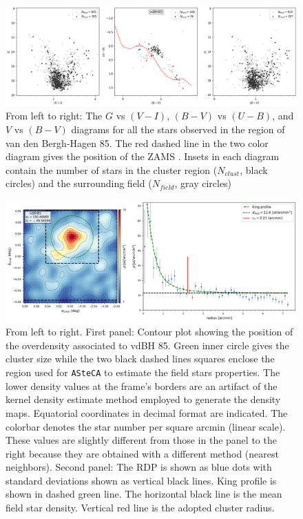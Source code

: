 \documentclass[draft]{aa}
\begin{document}
\begin{figure}[ht]
    \centering
    \includegraphics[width=\hsize]{../figs/obs_vdBH85.png}
\caption{From left to right: The $G$ vs $(V-I)$, $(B-V)$ vs $(U-B)$, and
$V$ vs $(B-V)$ diagrams for all the stars observed in the region of van
den Bergh-Hagen 85.
The red dashed line in the two color diagram gives the position of the ZAMS
\citep{Aller1982}. Insets in each diagram contain the number of stars 
in the cluster region ($N_{clust}$, black circles) and the surrounding
field ($N_{field}$, gray circles)
}
    \label{fig:photom_vdBH85} %
\end{figure}

\begin{figure}[ht]
    \centering
    \includegraphics[width=\hsize]{../figs/dmap_vdbh85.png}
\caption{From left to right. First panel:
Contour plot showing the position of the overdensity associated to vdBH 85.
Green inner circle gives the cluster size while the two black dashed lines
squares enclose the region used for \texttt{ASteCA} to estimate the field stars
properties. The lower density values at the frame's borders are an
artifact of the kernel density estimate method employed to generate the density
maps.
Equatorial coordinates in decimal format are indicated.
The colorbar denotes the star number per square arcmin (linear scale).
These values are slightly different from those in the panel to the right
because they are obtained with a different method (nearest neighbors).
%
Second panel: The RDP is shown as blue dots with standard deviations shown as
vertical black lines. King profile is shown in dashed green line. The
horizontal black line is the mean field star density. Vertical red line is the
adopted cluster radius.
}
    \label{fig:struct_vdBH85}
\end{figure}
\end{document}
